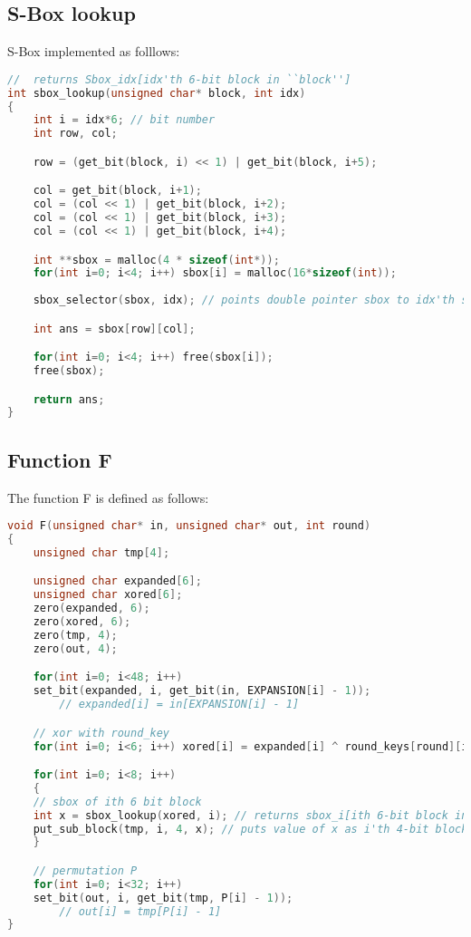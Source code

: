 \documentclass{article}
\begin{document}
\subsection{S-Box lookup}
S-Box implemented as folllows:
\begin{lstlisting}[language=c]
//  returns Sbox_idx[idx'th 6-bit block in ``block'']
int sbox_lookup(unsigned char* block, int idx)
{
    int i = idx*6; // bit number
    int row, col; 

    row = (get_bit(block, i) << 1) | get_bit(block, i+5);

    col = get_bit(block, i+1);
    col = (col << 1) | get_bit(block, i+2);
    col = (col << 1) | get_bit(block, i+3);
    col = (col << 1) | get_bit(block, i+4);

    int **sbox = malloc(4 * sizeof(int*));
    for(int i=0; i<4; i++) sbox[i] = malloc(16*sizeof(int));
    
    sbox_selector(sbox, idx); // points double pointer sbox to idx'th sbox 

    int ans = sbox[row][col];

    for(int i=0; i<4; i++) free(sbox[i]);
    free(sbox);

    return ans;
}
\end{lstlisting}

\subsection{Function F}
The function F is defined as follows:
\begin{lstlisting}[language=c]
void F(unsigned char* in, unsigned char* out, int round)
{
    unsigned char tmp[4];

    unsigned char expanded[6];
    unsigned char xored[6];
    zero(expanded, 6);
    zero(xored, 6);
    zero(tmp, 4);
    zero(out, 4);

    for(int i=0; i<48; i++)
	set_bit(expanded, i, get_bit(in, EXPANSION[i] - 1));
        // expanded[i] = in[EXPANSION[i] - 1]

    // xor with round_key
    for(int i=0; i<6; i++) xored[i] = expanded[i] ^ round_keys[round][i];

    for(int i=0; i<8; i++)
    {
	// sbox of ith 6 bit block
	int x = sbox_lookup(xored, i); // returns sbox_i[ith 6-bit block in xored]
	put_sub_block(tmp, i, 4, x); // puts value of x as i'th 4-bit block starting at address tmp
    }

    // permutation P
    for(int i=0; i<32; i++)
	set_bit(out, i, get_bit(tmp, P[i] - 1));
        // out[i] = tmp[P[i] - 1]
}
\end{lstlisting}
\end{document}
